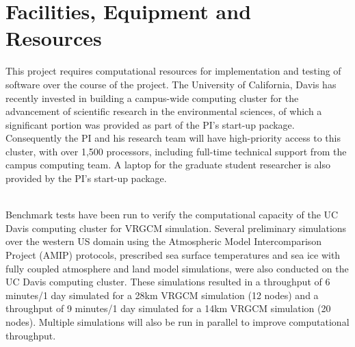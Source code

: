 \documentclass[11pt]{article}
\begin{document}
\setcounter{section}{2}

\appendix

\setcounter{section}{8}

\section{Facilities, Equipment and Resources}

This project requires computational resources for implementation and testing of software over the course of the project. The University of California, Davis has recently invested in building a campus-wide computing cluster for the advancement of scientific research in the environmental sciences, of which a significant portion was provided as part of the PI's start-up package. Consequently the PI and his research team will have high-priority access to this cluster, with over 1,500 processors, including full-time technical support from the campus computing team. A laptop for the graduate student researcher is also provided by the PI's start-up package.

\ \\

\noindent Benchmark tests have been run to verify the computational capacity of the UC Davis computing cluster for VRGCM simulation. Several preliminary simulations over the western US domain using the Atmospheric Model Intercomparison Project (AMIP) protocols, prescribed sea surface temperatures and sea ice with fully coupled atmosphere and land model simulations, were also conducted on the UC Davis computing cluster.  These simulations resulted in a  throughput of 6 minutes/1 day simulated for a 28km VRGCM simulation (12 nodes) and a throughput of 9 minutes/1 day simulated for a 14km VRGCM simulation (20 nodes).  Multiple simulations will also be run in parallel to improve computational throughput.
\end{document}
